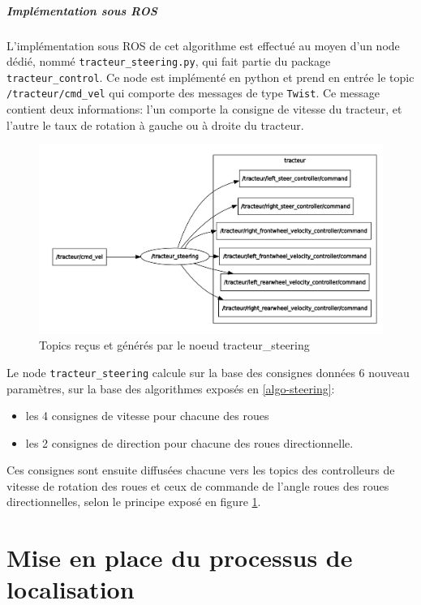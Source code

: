 \documentclass[12pt,a4paper]{report}
\begin{document}
			\paragraph{Implémentation sous ROS}
			
			L'implémentation sous ROS de cet algorithme est effectué au moyen d'un node dédié, nommé \verb|tracteur_steering.py|, qui fait partie du package \verb|tracteur_control|. Ce node est implémenté en python et prend en entrée le topic \verb|/tracteur/cmd_vel| qui comporte des messages de type \verb|Twist|. Ce message contient deux informations: l'un comporte la consigne de vitesse du tracteur, et l'autre le taux de rotation à gauche ou à droite du tracteur.
			
			\begin{figure}[h!]
				\centering
				\includegraphics[width=0.7\linewidth]{img/tracteur_steering}
				\caption[tracteur_steering]{Topics reçus et générés par le noeud tracteur\_steering}
				\label{fig:tracteursteering}
			\end{figure}
			
			\para Le node \verb|tracteur_steering| calcule sur la base des consignes données 6 nouveau paramètres, sur la base des algorithmes exposés en \ref{algo-steering}:
			\begin{itemize}
				\item les 4 consignes de vitesse pour chacune des roues
				\item les 2 consignes de direction pour chacune des roues directionnelle.
			\end{itemize}
			\newpage
			
			\para Ces consignes sont ensuite diffusées chacune vers les topics des controlleurs de vitesse de rotation des roues et ceux de commande de l'angle roues des roues directionnelles, selon le principe exposé en figure \ref{fig:tracteursteering}.
					

\chapter{Mise en place du processus de localisation}
\end{document}
